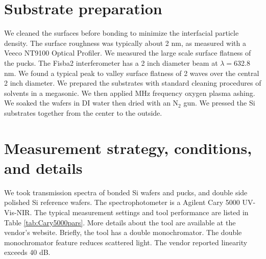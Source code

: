 \documentclass[osajnl,preprint,showpacs,superscriptaddress,12pt]{revtex4-1} %
\begin{document}
\section{Substrate preparation}
We cleaned the surfaces before bonding to minimize the interfacial particle density.  The surface roughness was typically about 2 nm, as measured with a Veeco NT9100 Optical Profiler.  We measured the large scale surface flatness of the pucks.  The Fisba2 interferometer has a 2 inch diameter beam at $\lambda=$632.8 nm.  We found a typical peak to valley surface flatness of 2 waves over the central 2 inch diameter.  We prepared the substrates with standard cleaning procedures of solvents in a megasonic.  We then applied MHz frequency oxygen plasma ashing.  We soaked the wafers in DI water then dried with an N$_2$ gun.  We pressed the Si substrates together from the center to the outside.


\section{Measurement strategy, conditions, and details}
We took transmission spectra of bonded Si wafers and pucks, and double side polished Si reference wafers. The spectrophotometer is a Agilent Cary 5000 UV-Vis-NIR.  The typical measurement settings and tool performance are listed in Table \ref{tab:Cary5000pars}.  More details about the tool are available at the vendor's website.  Briefly, the tool has a double monochromator.  The double monochromator feature reduces scattered light.  The vendor reported linearity exceeds 40 dB.  
\end{document}
